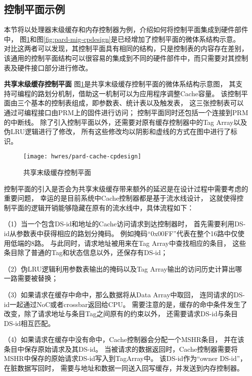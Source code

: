 \subsection{控制平面示例}

本节将以处理器末级缓存和内存控制器为例，介绍如何将控制平面集成到硬件部件中，
图\ref{fig:pard-cache-cpdesign}和图\ref{fig:pard-mig-cpdesign}是已经增加了控制平面的微体系结构示意。
对比这两者可以发现，其控制平面具有相同的结构，只是控制表的内容存在差别，
该通用的控制平面结构可以很容易的集成到不同的硬件部件中，而只需要对其控制表及硬件接口部分进行修改。

\textbf{共享末级缓存控制平面}\quad
图\ref{fig:pard-cache-cpdesign}是共享末级缓存控制平面的微体系结构示意图，
其支持可编程的路划分机制，借助这一机制可以为应用程序调整Cache容量。
该控制平面由三个基本的控制表组成，即参数表、统计表以及触发表，
这三张控制表可以通过可编程接口由PRM上的固件进行访问；
控制平面同时还包括一个连接到PRM的中断线。
除了引入控制平面以外，还需要对原有缓存控制器中的Tag Array以及伪LRU逻辑进行了修改，
所有这些修改均以阴影和虚线的方式在图中进行了标识。

\begin{figure}[tb]
  \centering
  \texttt{[image: hwres/pard-cache-cpdesign]}
  \caption{共享末级缓存控制平面}
  \label{fig:pard-cache-cpdesign}
\end{figure}

控制平面的引入是否会为共享末级缓存带来额外的延迟是在设计过程中需要考虑的重要问题，
幸运的是目前系统中Cache控制器都是基于流水线设计，
这就使得控制平面的逻辑开销能够隐藏在原有的流水线中，具体流程如下：

（1）当一个包含DS-id和地址的Cache访问请求到达控制器时，
首先需要利用DS-id从参数表中获得相应的路划分掩码。
例如掩码``0x00FF''代表在整个16路中仅使用低端的8路。
与此同时，请求地址被用来在Tag Array中查找相应的条目，
这些条目除了普通的Tag和状态信息以外，还保存有DS-id；

（2）伪LRU逻辑利用参数表输出的掩码以及Tag Array输出的访问历史计算出哪一路需要被替换；

（3）如果请求在缓存中命中，那么数据将从Data Array中取回，
连同请求的DS-id一起通过NoC或者crossbar返回给CPU。
需要注意的是，缓存的命中条件发生了改变，除了请求地址与条目Tag之间原有的约束以外，
还需要请求DS-id与条目DS-id相互匹配。

（4）如果请求在缓存中没有命中，Cache控制器会分配一个MSHR条目，
并在该条目中保存原始请求及其DS-id。
当被请求的数据返回时，Cache控制器需要将MSHR中保存的原始请求DS-id写入到TagArray中。
该DS-id作为``owner DS-id''，在脏数据写回时，
需要与地址和数据一同送入回写缓存，并发送到内存控制器。

